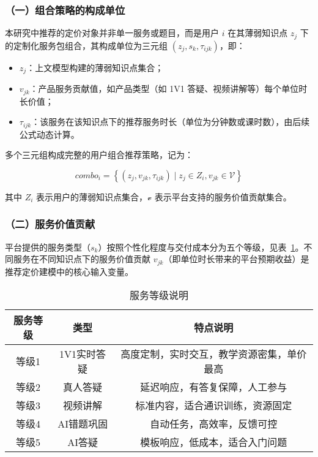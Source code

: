 \subsubsection*{（一）组合策略的构成单位}

本研究中推荐的定价对象并非单一服务或题目，而是用户 $i$ 在其薄弱知识点 $z_j$ 下的定制化服务包组合，其构成单位为三元组 $(z_j, s_k, \tau_{ijk})$，即：

\begin{itemize}
\item $z_j$：上文模型构建的薄弱知识点集合；
\item $v_{jk}$：产品服务贡献值，如产品类型（如 1V1 答疑、视频讲解等）每个单位时长价值；
\item $\tau_{ijk}$：该服务在该知识点下的推荐服务时长（单位为分钟数或课时数），由后续公式动态计算。
\end{itemize}

多个三元组构成完整的用户组合推荐策略，记为：

\begin{equation}
combo_i = \left\{ (z_j, v_{jk}, \tau_{ijk}) \mid z_j \in Z_i, v_{jk} \in \mathcal{V} \right\}
\end{equation}

其中 $Z_i$ 表示用户的薄弱知识点集合，$\mathcal{v}$ 表示平台支持的服务价值贡献集合。

\subsubsection*{（二）服务价值贡献}

平台提供的服务类型（$s_k$）按照个性化程度与交付成本分为五个等级，见表~\ref{tab:service_level_summary}。不同服务在不同知识点下的服务价值贡献 $v_{jk}$（即单位时长带来的平台预期收益）是推荐定价建模中的核心输入变量。

\begin{table}[!h]
\centering
\caption{服务等级说明}
\begin{tabular}{c c c}
\toprule
服务等级 & 类型 & 特点说明 \\
\midrule
等级1 & 1V1实时答疑 & 高度定制，实时交互，教学资源密集，单价最高 \\
等级2 & 真人答疑 & 延迟响应，有答复保障，人工参与 \\
等级3 & 视频讲解 & 标准内容，适合通识训练，资源固定 \\
等级4 & AI错题巩固 & 自动任务，高效率，反馈可控 \\
等级5 & AI答疑 & 模板响应，低成本，适合入门问题 \\
\bottomrule
\end{tabular}
\label{tab:service_level_summary}
\end{table}

